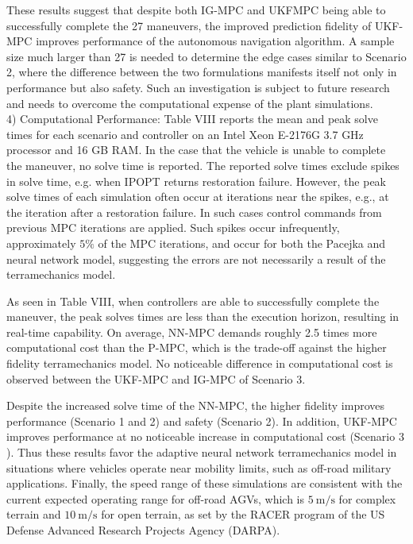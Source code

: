 \documentclass[10pt]{article}
\begin{document}
These results suggest that despite both IG-MPC and UKFMPC being able to successfully complete the 27 maneuvers, the improved prediction fidelity of UKF-MPC improves performance of the autonomous navigation algorithm. A sample size much larger than 27 is needed to determine the edge cases similar to Scenario 2, where the difference between the two formulations manifests itself not only in performance but also safety. Such an investigation is subject to future research and needs to overcome the computational expense of the plant simulations.\\
4) Computational Performance: Table VIII reports the mean and peak solve times for each scenario and controller on an Intel Xeon E-2176G 3.7 GHz processor and 16 GB RAM. In the case that the vehicle is unable to complete\\
the maneuver, no solve time is reported. The reported solve times exclude spikes in solve time, e.g. when IPOPT returns restoration failure. However, the peak solve times of each simulation often occur at iterations near the spikes, e.g., at the iteration after a restoration failure. In such cases control commands from previous MPC iterations are applied. Such spikes occur infrequently, approximately $5 \%$ of the MPC iterations, and occur for both the Pacejka and neural network model, suggesting the errors are not necessarily a result of the terramechanics model.

As seen in Table VIII, when controllers are able to successfully complete the maneuver, the peak solves times are less than the execution horizon, resulting in real-time capability. On average, NN-MPC demands roughly 2.5 times more computational cost than the P-MPC, which is the trade-off against the higher fidelity terramechanics model. No noticeable difference in computational cost is observed between the UKF-MPC and IG-MPC of Scenario 3.

Despite the increased solve time of the NN-MPC, the higher fidelity improves performance (Scenario 1 and 2) and safety (Scenario 2). In addition, UKF-MPC improves performance at no noticeable increase in computational cost (Scenario 3 ). Thus these results favor the adaptive neural network terramechanics model in situations where vehicles operate near mobility limits, such as off-road military applications. Finally, the speed range of these simulations are consistent with the current expected operating range for off-road AGVs, which is $5 \mathrm{~m} / \mathrm{s}$ for complex terrain and $10 \mathrm{~m} / \mathrm{s}$ for open terrain, as set by the RACER program of the US Defense Advanced Research Projects Agency (DARPA).
\end{document}
